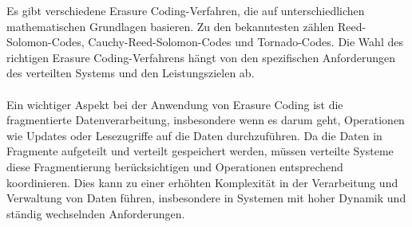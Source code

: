 \documentclass[../vs-script-first-v01.tex]{subfiles}
\begin{document}
Es gibt verschiedene Erasure Coding-Verfahren, die auf unterschiedlichen mathematischen Grundlagen basieren. Zu den bekanntesten zählen Reed-Solomon-Codes, Cauchy-Reed-Solomon-Codes und Tornado-Codes. Die Wahl des richtigen Erasure Coding-Verfahrens hängt von den spezifischen Anforderungen des verteilten Systems und den Leistungszielen ab.
\\\\
Ein wichtiger Aspekt bei der Anwendung von Erasure Coding ist die fragmentierte Datenverarbeitung, insbesondere wenn es darum geht, Operationen wie Updates oder Lesezugriffe auf die Daten durchzuführen. Da die Daten in Fragmente aufgeteilt und verteilt gespeichert werden, müssen verteilte Systeme diese Fragmentierung berücksichtigen und Operationen entsprechend koordinieren. Dies kann zu einer erhöhten Komplexität in der Verarbeitung und Verwaltung von Daten führen, insbesondere in Systemen mit hoher Dynamik und ständig wechselnden Anforderungen.
\end{document}

